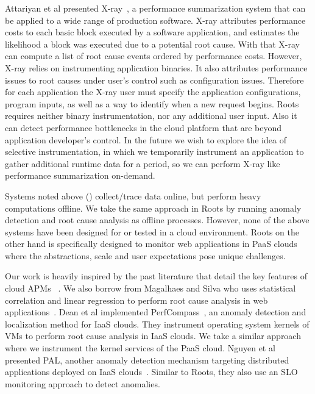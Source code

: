 Attariyan et al presented X-ray~\cite{Attariyan:2012:XAR:2387880.2387910}, 
a performance summarization system that can be applied
to a wide range of production software. X-ray attributes performance costs to each
basic block executed by a software application, and estimates the likelihood a block
was executed due to a potential root cause. With that X-ray can compute a list of root cause
events ordered by performance costs. However, X-ray relies on instrumenting application
binaries. It also attributes performance
issues to root causes under user's control such as configuration issues.
Therefore for each application the X-ray user must specify the application configurations,
program inputs, 
as well as a way to identify when a new request begins. Roots requires neither binary
instrumentation, nor any additional user input. Also it can detect performance bottlenecks
in the cloud platform that are beyond application developer's control. In the
future we wish to explore the idea of selective instrumentation, in which
we temporarily instrument an application to gather additional runtime data for a period, so
we can perform X-ray like performance summarization on-demand.

Systems noted above (\cite{Chen:2002:PPD:647883.738238,Aguilera:2003:PDD:945445.945454,Attariyan:2012:XAR:2387880.2387910}) 
collect/trace data online, but perform heavy computations
offline. We take the same approach in Roots by running anomaly detection
and root cause analysis as offline processes. However, none of the above
systems have been designed for or tested in a cloud environment. Roots on
the other hand is specifically designed to monitor web applications in
PaaS clouds where the abstractions, scale and user expectations pose unique challenges.

Our work is heavily inspired by the past literature that detail the key features of 
cloud APMs~\cite{DaCunhaRodrigues:2016:MCC:2851613.2851619,Ibidunmoye:2015:PAD:2808687.2791120} . 
We also borrow from
Magalhaes and Silva who uses statistical correlation and linear regression to perform
root cause analysis in web applications~\cite{Magalhaes:2010:DPA:1906485.1906774, Magalhaes:2011:RAP:1982185.1982234}. 
Dean et al implemented PerfCompass~\cite{Dean:2014:PTR:2696535.2696551}, 
an anomaly detection and localization method for IaaS clouds. They instrument operating system kernels
of VMs to perform root cause analysis in IaaS clouds. We take a similar approach where we instrument
the kernel services of the PaaS cloud.
Nguyen et al presented PAL, another anomaly detection mechanism targeting
distributed applications deployed on IaaS clouds~\cite{Nguyen:2011:PPR:2038633.2038634}. 
Similar to Roots, they also use an SLO monitoring approach to detect anomalies.